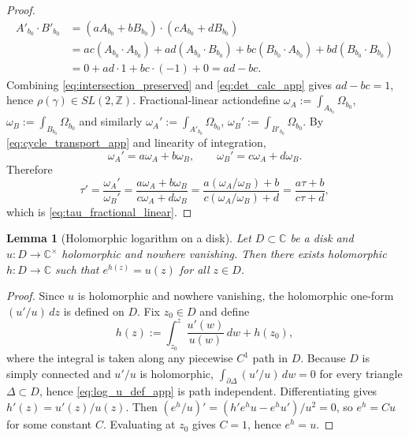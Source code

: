 \documentclass[11pt]{article}
\newtheorem{lemma}[theorem]{Lemma}
\theoremstyle{remark}
\begin{document}
{\begin{proof}
\begin{align}
A'_{b_0}\cdot B'_{b_0}
&=(aA_{b_0}+bB_{b_0})\cdot(cA_{b_0}+dB_{b_0}) \\
&=ac(A_{b_0}\cdot A_{b_0})+ad(A_{b_0}\cdot B_{b_0})+bc(B_{b_0}\cdot A_{b_0})+bd(B_{b_0}\cdot B_{b_0}) \nonumber\\
&=0+ad\cdot 1+bc\cdot(-1)+0=ad-bc. \nonumber
\end{align}
Combining \eqref{eq:intersection_preserved} and \eqref{eq:det_calc_app} gives $ad-bc=1$, hence $\rho(\gamma)\in SL(2,\mathbb{Z})$. Fractional-linear action\:define $\omega_A:=\int_{A_{b_0}}\Omega_{b_0}$, $\omega_B:=\int_{B_{b_0}}\Omega_{b_0}$ and similarly $\omega_A':=\int_{A'_{b_0}}\Omega_{b_0}$, $\omega_B':=\int_{B'_{b_0}}\Omega_{b_0}$. By \eqref{eq:cycle_transport_app} and linearity of integration,
\begin{equation}\label{eq:period_transform_app}
\omega_A'=a\omega_A+b\omega_B,\qquad \omega_B'=c\omega_A+d\omega_B.
\end{equation}
Therefore
\begin{equation}\label{eq:tau_transform_app}
\tau'=\frac{\omega_A'}{\omega_B'}=\frac{a\omega_A+b\omega_B}{c\omega_A+d\omega_B}
=\frac{a(\omega_A/\omega_B)+b}{c(\omega_A/\omega_B)+d}
=\frac{a\tau+b}{c\tau+d},
\end{equation}
which is \eqref{eq:tau_fractional_linear}.
\end{proof} 
\begin{lemma}[Holomorphic logarithm on a disk]\label{lem:holomorphic_log_disk}
Let $D\subset\mathbb{C}$ be a disk and $u:D\to\mathbb{C}^\times$ holomorphic and nowhere vanishing. Then there exists holomorphic $h:D\to\mathbb{C}$ such that $e^{h(z)}=u(z)$ for all $z\in D$.
\end{lemma}
\begin{proof}
Since $u$ is holomorphic and nowhere vanishing, the holomorphic one-form $(u'/u)\,dz$ is defined on $D$. Fix $z_0\in D$ and define
\begin{equation}\label{eq:log_u_def_app}
h(z):=\int_{z_0}^{z}\frac{u'(w)}{u(w)}\,dw+h(z_0),
\end{equation}
where the integral is taken along any piecewise $C^1$ path in $D$. Because $D$ is simply connected and $u'/u$ is holomorphic, $\int_{\partial\Delta} (u'/u)\,dw=0$ for every triangle $\Delta\subset D$, hence \eqref{eq:log_u_def_app} is path independent. Differentiating gives $h'(z)=u'(z)/u(z)$. Then $(e^{h}/u)'=(h'e^{h}u-e^{h}u')/u^2=0$, so $e^{h}=Cu$ for some constant $C$. Evaluating at $z_0$ gives $C=1$, hence $e^{h}=u$.
\end{proof}

}
\end{document}
